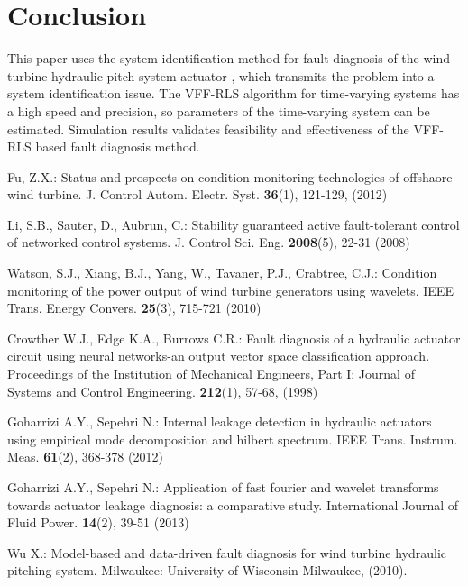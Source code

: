 \documentclass{article}
\begin{document}
\section{Conclusion}

This paper uses the system identification method for fault diagnosis of
the wind turbine hydraulic
pitch system actuator , which transmits the problem into a system
identification issue. The VFF-RLS algorithm for time-varying systems
has a high speed and precision, so parameters of the time-varying system
can be estimated. Simulation results validates feasibility and effectiveness
 of the VFF-RLS based fault diagnosis method.




\clearpage
\begin{thebibliography}{99}
Fu, Z.X.: Status and prospects on condition monitoring technologies of offshaore wind turbine. J. Control Autom. Electr. Syst. \textbf{36}(1), 121-129, (2012)


Li, S.B., Sauter, D., Aubrun, C.: Stability guaranteed active fault-tolerant control of networked control systems. J. Control Sci. Eng. \textbf{2008}(5), 22-31 (2008)


Watson, S.J., Xiang, B.J., Yang, W., Tavaner, P.J., Crabtree, C.J.: Condition monitoring of the power output of wind turbine generators using wavelets. IEEE Trans. Energy Convers. \textbf{25}(3), 715-721 (2010)


Crowther W.J., Edge K.A., Burrows C.R.: Fault diagnosis of a hydraulic actuator circuit using neural networks-an output vector space classification approach. Proceedings of the Institution of Mechanical Engineers, Part I: Journal of Systems and Control Engineering. \textbf{212}(1), 57-68, (1998)


Goharrizi A.Y., Sepehri N.: Internal leakage detection in hydraulic actuators using empirical mode decomposition and hilbert spectrum. IEEE Trans. Instrum. Meas. \textbf{61}(2), 368-378 (2012)



Goharrizi A.Y., Sepehri N.: Application of fast fourier and wavelet transforms towards actuator leakage diagnosis: a comparative study. International Journal of Fluid Power. \textbf{14}(2), 39-51 (2013)



Wu X.: Model-based and data-driven fault diagnosis for wind turbine hydraulic pitching system. Milwaukee: University of Wisconsin-Milwaukee, (2010).



\end{thebibliography}
\end{document}
